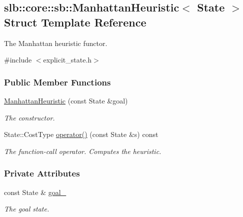 \hypertarget{structslb_1_1core_1_1sb_1_1ManhattanHeuristic}{}\subsection{slb\+:\+:core\+:\+:sb\+:\+:Manhattan\+Heuristic$<$ State $>$ Struct Template Reference}
\label{structslb_1_1core_1_1sb_1_1ManhattanHeuristic}


The Manhattan heuristic functor.  




{\ttfamily \#include $<$explicit\+\_\+state.\+h$>$}

\subsubsection*{Public Member Functions}
\begin{DoxyCompactItemize}
\item 
\hyperlink{structslb_1_1core_1_1sb_1_1ManhattanHeuristic_affbf12beb24ff7636d7fedb2fa5ec4f5}{Manhattan\+Heuristic} (const State \&goal)
\begin{DoxyCompactList}\small\item\em The constructor. \end{DoxyCompactList}\item 
State\+::\+Cost\+Type \hyperlink{structslb_1_1core_1_1sb_1_1ManhattanHeuristic_a609b1c3e22e5a20b6c35756b6a78ca08}{operator()} (const State \&s) const 
\begin{DoxyCompactList}\small\item\em The function-\/call operator. Computes the heuristic. \end{DoxyCompactList}\end{DoxyCompactItemize}
\subsubsection*{Private Attributes}
\begin{DoxyCompactItemize}
\item 
const State \& \hyperlink{structslb_1_1core_1_1sb_1_1ManhattanHeuristic_a3802498ba40c49e18f3c8406bb243ee7}{goal\+\_\+}\hypertarget{structslb_1_1core_1_1sb_1_1ManhattanHeuristic_a3802498ba40c49e18f3c8406bb243ee7}{}\label{structslb_1_1core_1_1sb_1_1ManhattanHeuristic_a3802498ba40c49e18f3c8406bb243ee7}

\begin{DoxyCompactList}\small\item\em The goal state. \end{DoxyCompactList}\end{DoxyCompactItemize}


